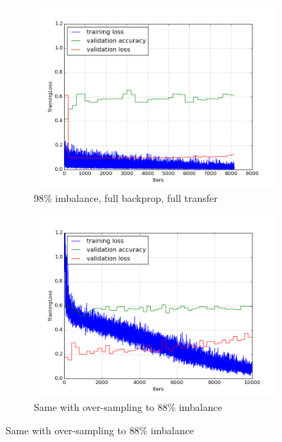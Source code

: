 \documentclass[a4paper,11pt]{article}
\begin{document}
\begin{figure}[!]
    \centering
    \begin{minipage}[b]{\textwidth}
      \begin{subfigure}{.5\textwidth} 
        \centering
        \includegraphics[scale=0.4]{images/plot_clampdetCI98_none_bs128_lr4.png}
        \caption{98\% imbalance, full backprop, full transfer}\label{fig:2a}
      \end{subfigure}%
      \begin{subfigure}{.5\textwidth} 
        \centering
        \includegraphics[scale=0.4]{images/plot_clampdet_os_none_reinit.png}
        \caption{Same with over-sampling to 88\% imbalance}\label{fig:2b}
      \end{subfigure} \par \vspace*{20pt} %
    \end{minipage}%
\end{figure}
\end{document}
